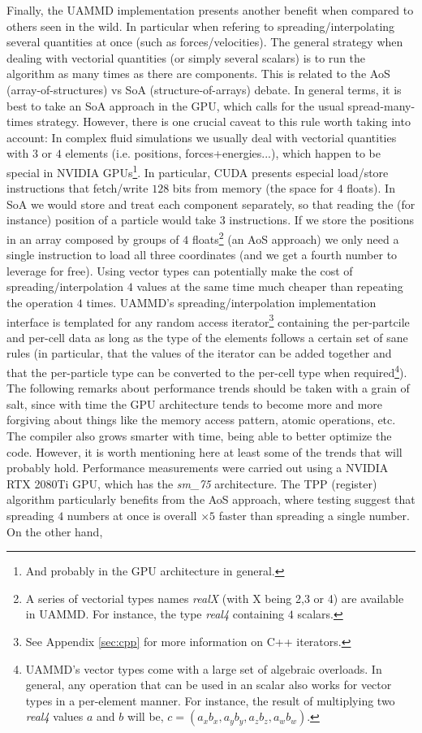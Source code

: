 \documentclass[ twoside,openright,titlepage,numbers=noenddot,%
headinclude,footinclude,cleardoublepage=empty,abstract=on,
BCOR=5mm,paper=a4,fontsize=11pt, dvipsnames
]{scrreprt}
\newcommand{\uammd}{\gls{UAMMD}\xspace}
\newcommand{\gpu}{\gls{GPU}\xspace}
\begin{document}
Finally, the \uammd implementation presents another benefit when compared to others seen in the wild. In particular when refering to spreading/interpolating several quantities at once (such as forces/velocities). The general strategy when dealing with vectorial quantities (or simply several scalars) is to run the algorithm as many times as there are components. This is related to the AoS (array-of-structures) vs SoA (structure-of-arrays) debate. In general terms, it is best to take an SoA approach in the GPU, which calls for the usual spread-many-times strategy. However, there is one crucial caveat to this rule worth taking into account: In complex fluid simulations we usually deal with vectorial quantities with $3$ or $4$ elements (i.e. positions, forces+energies...), which happen to be special in NVIDIA GPUs\footnote{And probably in the GPU architecture in general.}. In particular, CUDA presents especial load/store instructions that fetch/write $128$ bits from memory (the space for $4$ floats). In SoA we would store and treat each component separately, so that reading the (for instance) position of a particle would take $3$ instructions. If we store the positions in an array composed by groups of $4$ floats\footnote{A series of vectorial types names \emph{realX} (with X being 2,3 or 4) are available in \uammd. For instance, the type \emph{real4} containing $4$ scalars.} (an AoS approach) we only need a single instruction to load all three coordinates (and we get a fourth number to leverage for free). Using vector types can potentially make the cost of spreading/interpolation $4$ values at the same time much cheaper than repeating the operation $4$ times. \uammd's spreading/interpolation implementation interface is templated for any random access iterator\footnote{See Appendix \ref{sec:cpp} for more information on C++ iterators.} containing the per-partcile and per-cell data as long as the type of the elements follows a certain set of sane rules (in particular, that the values of the iterator can be added together and that the per-particle type can be converted to the per-cell type when required\footnote{\uammd's vector types come with a large set of algebraic overloads. In general, any operation that can be used in an scalar also works for vector types in a per-element manner. For instance, the result of multiplying two \emph{real4} values $a$ and $b$ will be, $c = (a_xb_x, a_yb_y, a_zb_z, a_wb_w)$.}).
The following remarks about performance trends should be taken with a grain of salt, since with time the \gpu architecture tends to become more and more forgiving about things like the memory access pattern, atomic operations, etc. The compiler also grows smarter with time, being able to better optimize the code. However, it is worth mentioning here at least some of the trends that will probably hold. Performance measurements were carried out using a NVIDIA RTX 2080Ti \gpu, which has the \emph{sm\_75} architecture.
The TPP (register) algorithm particularly benefits from the AoS approach, where testing suggest that spreading $4$ numbers at once is overall $\times 5$ faster than spreading a single number.
On the other hand, 
\end{document}
